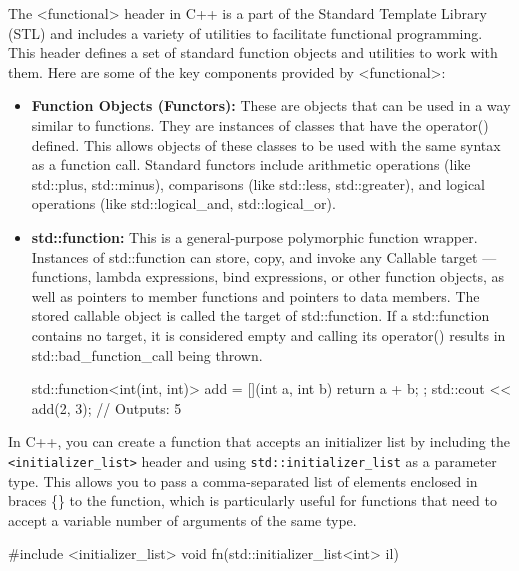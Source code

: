 \documentclass{report}
\begin{document}
\begin{concept}
    \pagebreak
    \bigbreak \noindent 
    \begin{concept}
       The <functional> header in C++ is a part of the Standard Template Library (STL) and includes a variety of utilities to facilitate functional programming. This header defines a set of standard function objects and utilities to work with them. Here are some of the key components provided by <functional>:
    \end{concept}
    \begin{itemize}
        \item \textbf{Function Objects (Functors):} These are objects that can be used in a way similar to functions. They are instances of classes that have the operator() defined. This allows objects of these classes to be used with the same syntax as a function call. Standard functors include arithmetic operations (like std::plus, std::minus), comparisons (like std::less, std::greater), and logical operations (like std::logical\_and, std::logical\_or).
        \item \textbf{std::function:} This is a general-purpose polymorphic function wrapper. Instances of std::function can store, copy, and invoke any Callable target — functions, lambda expressions, bind expressions, or other function objects, as well as pointers to member functions and pointers to data members. The stored callable object is called the target of std::function. If a std::function contains no target, it is considered empty and calling its operator() results in std::bad\_function_call being thrown.
            \bigbreak \noindent 
            \begin{cppcode}
                std::function<int(int, int)> add = [](int a, int b) { return a + b; };
                std::cout << add(2, 3); // Outputs: 5
            \end{cppcode}
    \end{itemize}

    \pagebreak
    \bigbreak \noindent 
    In C++, you can create a function that accepts an initializer list by including the \texttt{<initializer\_list>} header and using \texttt{std::initializer\_list} as a parameter type. This allows you to pass a comma-separated list of elements enclosed in braces \{\} to the function, which is particularly useful for functions that need to accept a variable number of arguments of the same type.
    \bigbreak \noindent 
    \begin{cppcode}
#include <initializer_list>
void fn(std::initializer_list<int> il) { }


\end{cppcode}
\end{concept}
\end{document}
